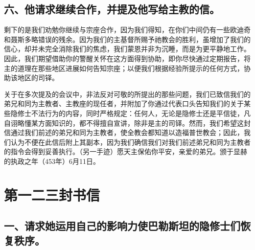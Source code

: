 
\subsection{六、他请求继续合作，并提及他写给主教的信。}

剩下的是我们劝勉你继续与宗座合作，因为我们得知，在你们中间仍有一些欧迪奇和聂斯多略错误的残余。因为我们的主基督所赐予祂教会的胜利，虽增加了我们的信心，却并未完全消除我们的焦虑，我们蒙恩并非为沉睡，而是为更平静地工作。因此，我们期望借助你的警醒关怀在这方面得到协助，即你尽快通过定期报告，将主的道理在那些地区进展如何告知宗座；以便我们根据经验所提示的任何方式，协助该地区的司铎。\par

关于在多次提及的会议中，非法反对可敬的所提出的那些问题，我们已致信我们的弟兄和同为主教者、主教座的现任者，并附加了你通过代表口头告知我们的关于某些隐修士不法行为的内容，同时严格规定：任何人，无论是隐修士还是平信徒，凡自诩略懂某方面知识的，都不得擅自宣讲，除非是主的司铎。然而，我们希望这封信通过我们前述的弟兄和同为主教者，使全教会都知道以造福普世教会；因此，我们认为不便在此信后附上其副本，因为我们确信我们对我们前述弟兄和同为主教者的指令会得到妥善执行。（另一手迹）愿天主保佑你平安，亲爱的弟兄。颁于显赫的执政之年（453年）6月11日。\par



\section{第一二三封书信}

\newline{}\par


\subsection{一、请求她运用自己的影响力使巴勒斯坦的隐修士们恢复秩序。}

